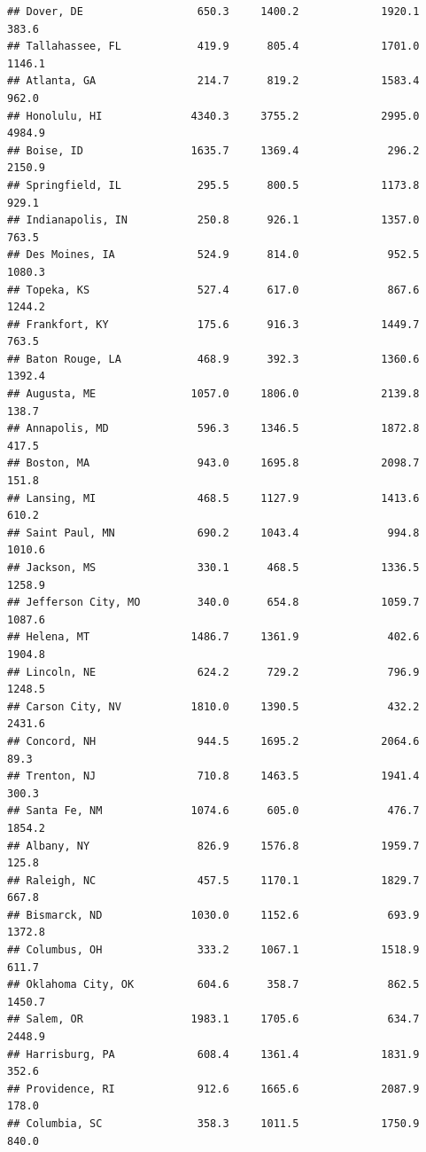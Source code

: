 \documentclass[
]{article}
\begin{document}
\begin{verbatim}
## Dover, DE                  650.3     1400.2             1920.1          383.6
## Tallahassee, FL            419.9      805.4             1701.0         1146.1
## Atlanta, GA                214.7      819.2             1583.4          962.0
## Honolulu, HI              4340.3     3755.2             2995.0         4984.9
## Boise, ID                 1635.7     1369.4              296.2         2150.9
## Springfield, IL            295.5      800.5             1173.8          929.1
## Indianapolis, IN           250.8      926.1             1357.0          763.5
## Des Moines, IA             524.9      814.0              952.5         1080.3
## Topeka, KS                 527.4      617.0              867.6         1244.2
## Frankfort, KY              175.6      916.3             1449.7          763.5
## Baton Rouge, LA            468.9      392.3             1360.6         1392.4
## Augusta, ME               1057.0     1806.0             2139.8          138.7
## Annapolis, MD              596.3     1346.5             1872.8          417.5
## Boston, MA                 943.0     1695.8             2098.7          151.8
## Lansing, MI                468.5     1127.9             1413.6          610.2
## Saint Paul, MN             690.2     1043.4              994.8         1010.6
## Jackson, MS                330.1      468.5             1336.5         1258.9
## Jefferson City, MO         340.0      654.8             1059.7         1087.6
## Helena, MT                1486.7     1361.9              402.6         1904.8
## Lincoln, NE                624.2      729.2              796.9         1248.5
## Carson City, NV           1810.0     1390.5              432.2         2431.6
## Concord, NH                944.5     1695.2             2064.6           89.3
## Trenton, NJ                710.8     1463.5             1941.4          300.3
## Santa Fe, NM              1074.6      605.0              476.7         1854.2
## Albany, NY                 826.9     1576.8             1959.7          125.8
## Raleigh, NC                457.5     1170.1             1829.7          667.8
## Bismarck, ND              1030.0     1152.6              693.9         1372.8
## Columbus, OH               333.2     1067.1             1518.9          611.7
## Oklahoma City, OK          604.6      358.7              862.5         1450.7
## Salem, OR                 1983.1     1705.6              634.7         2448.9
## Harrisburg, PA             608.4     1361.4             1831.9          352.6
## Providence, RI             912.6     1665.6             2087.9          178.0
## Columbia, SC               358.3     1011.5             1750.9          840.0

\end{verbatim}
\end{document}
